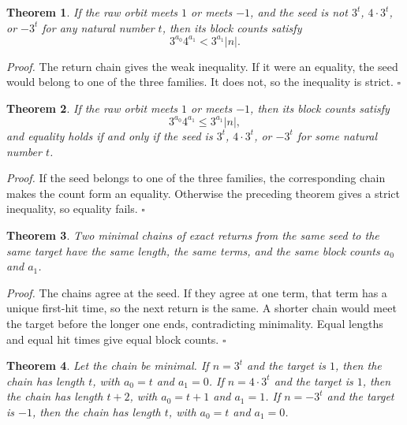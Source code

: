\documentclass[11pt,letterpaper]{article}
\newtheorem{theorem}{Theorem}
\newenvironment{proof}{\noindent\textit{Proof.}}{\hfill\(\square\)}
\begin{document}
\begin{theorem}
\label{thm:strict}
If the raw orbit meets \(1\) or meets \(-1\), and the seed is not \(3^{t}\), \(4\cdot 3^{t}\), or \(-3^{t}\) for any natural number \(t\), then its block counts satisfy
\[
3^{a_{0}}4^{a_{1}}<3^{a_{1}}|n|.
\]
\end{theorem}

\begin{proof}
The return chain gives the weak inequality. If it were an equality, the seed would belong to one of the three families. It does not, so the inequality is strict.
\end{proof}

\begin{theorem}
\label{thm:sharp}
If the raw orbit meets \(1\) or meets \(-1\), then its block counts satisfy
\[
3^{a_{0}}4^{a_{1}}\le 3^{a_{1}}|n|,
\]
and equality holds if and only if the seed is \(3^{t}\), \(4\cdot 3^{t}\), or \(-3^{t}\) for some natural number \(t\).
\end{theorem}

\begin{proof}
If the seed belongs to one of the three families, the corresponding chain makes the count form an equality. Otherwise the preceding theorem gives a strict inequality, so equality fails.
\end{proof}

\begin{theorem}
\label{thm:countunique}
Two minimal chains of exact returns from the same seed to the same target have the same length, the same terms, and the same block counts \(a_{0}\) and \(a_{1}\).
\end{theorem}

\begin{proof}
The chains agree at the seed. If they agree at one term, that term has a unique first-hit time, so the next return is the same. A shorter chain would meet the target before the longer one ends, contradicting minimality. Equal lengths and equal hit times give equal block counts.
\end{proof}

\begin{theorem}
\label{thm:familycounts}
Let the chain be minimal. If \(n=3^{t}\) and the target is \(1\), then the chain has length \(t\), with \(a_{0}=t\) and \(a_{1}=0\). If \(n=4\cdot 3^{t}\) and the target is \(1\), then the chain has length \(t+2\), with \(a_{0}=t+1\) and \(a_{1}=1\). If \(n=-3^{t}\) and the target is \(-1\), then the chain has length \(t\), with \(a_{0}=t\) and \(a_{1}=0\).
\end{theorem}
\end{document}
